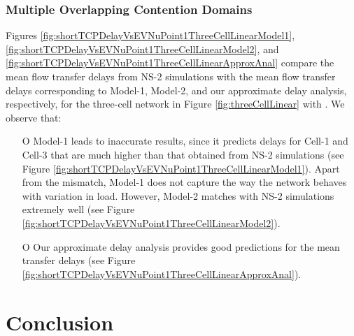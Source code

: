 \documentclass[10pt,a4paper,journal]{IEEEtran}
\theoremstyle{definition}
\theoremstyle{remark}
\theoremstyle{plain}
\begin{document}
\subsubsection{Multiple Overlapping Contention Domains}
\label{subsubsec:multiple-contention-domain}

Figures \ref{fig:shortTCPDelayVsEVNuPoint1ThreeCellLinearModel1},
\ref{fig:shortTCPDelayVsEVNuPoint1ThreeCellLinearModel2}, and
\ref{fig:shortTCPDelayVsEVNuPoint1ThreeCellLinearApproxAnal} compare
the mean flow transfer delays from NS-2 simulations with the mean flow
transfer delays corresponding to Model-1, Model-2, and our approximate
delay analysis, respectively, for the three-cell network in Figure
\ref{fig:threeCellLinear} with . We observe 
that: 
\begin{itemize}

\item [O] Model-1 leads to inaccurate results, since it 
predicts delays for Cell-1 and Cell-3 that are much higher than that 
obtained from NS-2 simulations (see Figure 
\ref{fig:shortTCPDelayVsEVNuPoint1ThreeCellLinearModel1}). Apart from 
the mismatch, Model-1 does not capture the way the network behaves with variation in load. However, 
Model-2 matches with NS-2 simulations extremely well (see Figure
\ref{fig:shortTCPDelayVsEVNuPoint1ThreeCellLinearModel2}). 

\item [O] Our approximate delay analysis provides good 
predictions for the mean transfer delays (see Figure 
\ref{fig:shortTCPDelayVsEVNuPoint1ThreeCellLinearApproxAnal}). 

\end{itemize}







\section{Conclusion}
\label{sec:conclusion}
\end{document}
